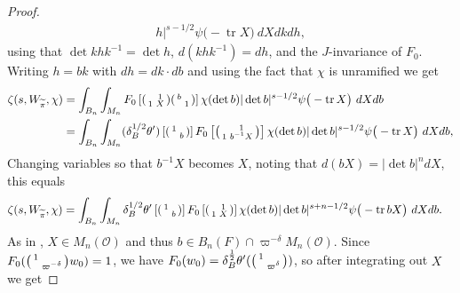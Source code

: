 \documentclass{amsart}
\theoremstyle{definition}
\newcommand{\tr}{\operatorname{tr}}
\newenvironment{spmatrix}{\left(\begin{smallmatrix}}{\end{smallmatrix}\right)}
\begin{document}
{\begin{proof}
\begin{align*}
		h|^{s-1/2}\psi\big(-\tr X\big)\ dXdkdh,
	\end{align*}
using that $\det khk^{-1}=\det h$, $d (khk^{-1})=d h$, and the
$J$-invariance of $F_0$. Writing $h=bk$ with $dh=dk\cdot db$ and using the fact that $\chi$ is unramified we get
\begin{align*}
		\zeta(s,  W_{\widetilde\pi} , \chi)
  &=\int_{B_n}\int_{M_n}F_0\left[\begin{spmatrix}
			&1\\1&X\end{spmatrix}\begin{spmatrix}
			b&\\&1\end{spmatrix}\right]  \chi(\det b)|\det
		b|^{s-1/2}\psi\big(-\tr X\big)\ dXdb\\
  &=\int_{B_n}\int_{M_n}(\delta_B^{1/2} \theta')\left[\begin{spmatrix} 1&\\&b\end{spmatrix}\right]F_0\left[\begin{spmatrix}
			&1\\1&b^{-1} X\end{spmatrix}\right]  \chi(\det b)|\det
		b|^{s-1/2}\psi\big(-\tr X\big)\ dXdb,
\end{align*}
Changing variables so that $b^{-1}X$ becomes $X$, noting that $d(bX)=|\det b|^n dX$, this equals
\begin{align*}
		\zeta(s,  W_{\widetilde\pi} , \chi)
  &=\int_{B_n}\int_{M_n}\delta_B^{1/2} \theta'\left[\begin{spmatrix} 1&\\&b\end{spmatrix}\right]F_0\left[\begin{spmatrix}
			&1\\1&X\end{spmatrix}\right] \chi(\det b)|\det
		b|^{s+n-1/2}\psi\big(-\tr bX\big)\ dXdb.
\end{align*}
As in \cite[Prop. 9.3]{BDGJW}, $X\in M_n(\mathcal{O})$ and thus $b\in B_n(F)\cap \varpi^{-\delta}M_n(\mathcal{O})$. Since $F_0(\begin{spmatrix} 1&\\&\varpi^{-\delta}\end{spmatrix}w_0)=1$, we have $F_0(w_0)=\delta_B^{\frac{1}{2}}\theta'(\begin{spmatrix} 1&\\&\varpi^{\delta}\end{spmatrix})$, so after integrating out $X$ we get

\end{proof}}
\end{document}
